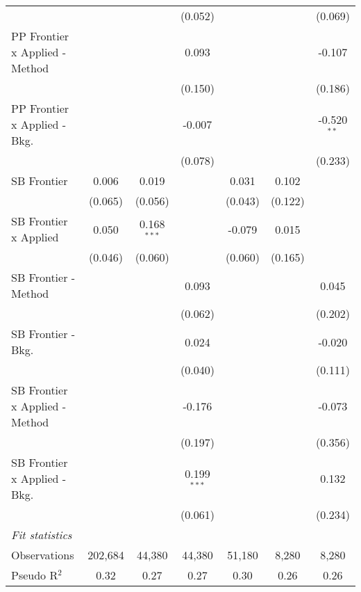 \begin{tabular}{lcccccc}
                                  &               &                & (0.052)        &               &               & (0.069)\\   
   PP Frontier x Applied - Method &               &                & 0.093          &               &               & -0.107\\   
                                  &               &                & (0.150)        &               &               & (0.186)\\   
   PP Frontier x Applied - Bkg.   &               &                & -0.007         &               &               & -0.520$^{**}$\\   
                                  &               &                & (0.078)        &               &               & (0.233)\\   
   SB Frontier                    & 0.006         & 0.019          &                & 0.031         & 0.102         &   \\   
                                  & (0.065)       & (0.056)        &                & (0.043)       & (0.122)       &   \\   
   SB Frontier x Applied          & 0.050         & 0.168$^{***}$  &                & -0.079        & 0.015         &   \\   
                                  & (0.046)       & (0.060)        &                & (0.060)       & (0.165)       &   \\   
   SB Frontier - Method           &               &                & 0.093          &               &               & 0.045\\   
                                  &               &                & (0.062)        &               &               & (0.202)\\   
   SB Frontier - Bkg.             &               &                & 0.024          &               &               & -0.020\\   
                                  &               &                & (0.040)        &               &               & (0.111)\\   
   SB Frontier x Applied - Method &               &                & -0.176         &               &               & -0.073\\   
                                  &               &                & (0.197)        &               &               & (0.356)\\   
   SB Frontier x Applied - Bkg.   &               &                & 0.199$^{***}$  &               &               & 0.132\\   
                                  &               &                & (0.061)        &               &               & (0.234)\\   
   \midrule
   \emph{Fit statistics}\\
   Observations                   & 202,684       & 44,380         & 44,380         & 51,180        & 8,280         & 8,280\\  
   Pseudo R$^2$                   & 0.32          & 0.27           & 0.27           & 0.30          & 0.26          & 0.26\\  
   

\end{tabular}
